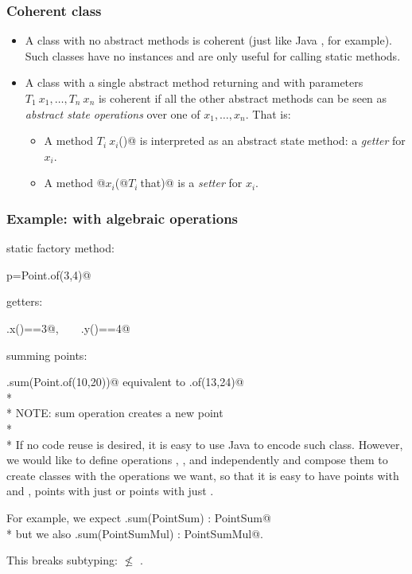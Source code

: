 \begin{frame}[fragile]
\frametitle{Coherent class}
\begin{itemize}
\item A class with no abstract methods is coherent (just like Java
  \Q@Math@, for example). Such classes have no instances and are only useful for calling static methods.
\item A class with a single abstract \Q@static@ method 
returning \Q@This@ and with parameters $T_1\ x_1, \ldots, T_n\ x_n$
is coherent if all the other abstract methods can be seen as \emph{abstract state
operations} over one of $x_1, \ldots, x_n$.
That is:
\begin{itemize}
\item A method $T_i\ x_i$\Q@()@ is interpreted as an abstract state method: a \emph{getter} for $x_i$.
\item A method \Q@void @$x_i$\Q@(@$T_i\ $\Q@ that)@ is a \emph{setter} for $x_i$.
\end{itemize}
\end{itemize}
\end{frame}


\begin{frame}[fragile]
\frametitle{Example: \Q@Point@s with algebraic operations}
\vspace{-2ex}
static factory method:

\quad\quad \Q@Point p=Point.of(3,4)@

getters:

\quad\quad \Q@p.x()==3@,\ \ \ \   \Q@p.y()==4@

summing points:

\quad\quad \Q@p.sum(Point.of(10,20))@ equivalent to \Q@Point.of(13,24)@
\\*${}_{}$\vspace{-1ex}\\*
NOTE: sum operation creates a new point
\\*${}_{}$\vspace{-1ex}\\*
If no code reuse is desired, it is easy to use Java to encode such \Q@Point@ class.
However, we would like to define operations \Q@sum@, \Q@mul@, \Q@div@ and \Q@sub@
independently and compose them to create classes with the operations we want,
so that it is easy to have points with \Q@sum@ and \Q@mul@, points with
just \Q@sum@ or points with just \Q@mul@.

For example, we expect \Q@PointSum.sum(PointSum) : PointSum@\\*
but we also \Q@PointSumMul.sum(PointSumMul) : PointSumMul@.

This breaks subtyping: \Q@PointSumMul@ $\not\leq$ \Q@PointSum@.


\end{frame}


